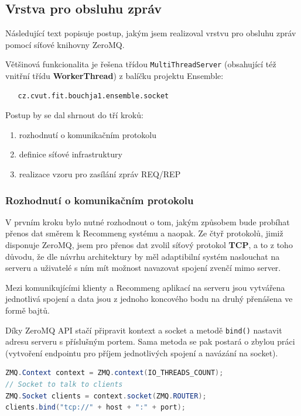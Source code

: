 \documentclass[thesis=M,czech]{FITthesis}[2014/05/07]
\begin{document}
\subsection{Vrstva pro obsluhu zpráv}
\label{sub:messvrs}
Následující text popisuje postup, jakým jsem realizoval vrstvu pro obsluhu zpráv pomocí síťové knihovny ZeroMQ.

Většinová funkcionalita je řešena třídou \texttt{MultiThreadServer} (obsahující též vnitřní třídu \textbf{WorkerThread}) z balíčku projektu Ensemble:

\begin{verbatim}
   cz.cvut.fit.bouchja1.ensemble.socket
\end{verbatim}

Postup by se dal shrnout do tří kroků:

\begin{enumerate}
	\item rozhodnutí o komunikačním protokolu
	\item definice síťové infrastruktury
	\item realizace vzoru pro zasílání zpráv REQ/REP
\end{enumerate}

\subsubsection{Rozhodnutí o komunikačním protokolu}
\label{subsub:kompr}
V prvním kroku bylo nutné rozhodnout o tom, jakým způsobem bude probíhat přenos dat směrem k Recommeng systému a naopak. Ze čtyř protokolů, jimiž disponuje ZeroMQ, jsem pro přenos dat zvolil síťový protokol \textbf{TCP}, a to z toho důvodu, že dle návrhu architektury by měl adaptibilní systém naslouchat na serveru a uživatelé s ním mít možnost navazovat spojení zvenčí mimo server.

Mezi komunikujícími klienty a Recommeng aplikací na serveru jsou vytvářena jednotlivá spojení a data jsou z jednoho koncového bodu na druhý přenášena ve formě bajtů.

Díky ZeroMQ API stačí připravit kontext a socket a metodě \texttt{bind()} nastavit adresu serveru s příslušným portem. Sama metoda se pak postará o zbylou práci (vytvoření endpointu pro příjem jednotlivých spojení a navázání na socket).

\begin{lstlisting}[language=java]
ZMQ.Context context = ZMQ.context(IO_THREADS_COUNT);
// Socket to talk to clients
ZMQ.Socket clients = context.socket(ZMQ.ROUTER);
clients.bind("tcp://" + host + ":" + port);
\end{lstlisting}
\end{document}
